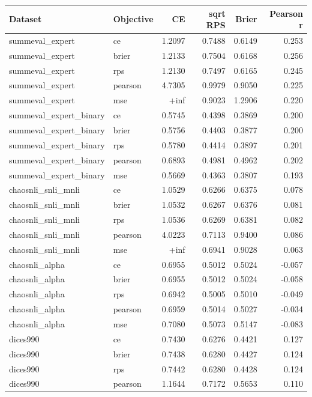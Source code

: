 \begin{tabular}{llrrrr}
\hline
Dataset & Objective & CE & sqrt RPS & Brier & Pearson r \\
\hline
summeval_expert & ce & 1.2097 & 0.7488 & 0.6149 & 0.253 \\
summeval_expert & brier & 1.2133 & 0.7504 & 0.6168 & 0.256 \\
summeval_expert & rps & 1.2130 & 0.7497 & 0.6165 & 0.245 \\
summeval_expert & pearson & 4.7305 & 0.9979 & 0.9050 & 0.225 \\
summeval_expert & mse & +inf & 0.9023 & 1.2906 & 0.220 \\
summeval_expert_binary & ce & 0.5745 & 0.4398 & 0.3869 & 0.200 \\
summeval_expert_binary & brier & 0.5756 & 0.4403 & 0.3877 & 0.200 \\
summeval_expert_binary & rps & 0.5780 & 0.4414 & 0.3897 & 0.201 \\
summeval_expert_binary & pearson & 0.6893 & 0.4981 & 0.4962 & 0.202 \\
summeval_expert_binary & mse & 0.5669 & 0.4363 & 0.3807 & 0.193 \\
chaosnli_snli_mnli & ce & 1.0529 & 0.6266 & 0.6375 & 0.078 \\
chaosnli_snli_mnli & brier & 1.0532 & 0.6267 & 0.6376 & 0.081 \\
chaosnli_snli_mnli & rps & 1.0536 & 0.6269 & 0.6381 & 0.082 \\
chaosnli_snli_mnli & pearson & 4.0223 & 0.7113 & 0.9400 & 0.086 \\
chaosnli_snli_mnli & mse & +inf & 0.6941 & 0.9028 & 0.063 \\
chaosnli_alpha & ce & 0.6955 & 0.5012 & 0.5024 & -0.057 \\
chaosnli_alpha & brier & 0.6955 & 0.5012 & 0.5024 & -0.058 \\
chaosnli_alpha & rps & 0.6942 & 0.5005 & 0.5010 & -0.049 \\
chaosnli_alpha & pearson & 0.6959 & 0.5014 & 0.5027 & -0.034 \\
chaosnli_alpha & mse & 0.7080 & 0.5073 & 0.5147 & -0.083 \\
dices990 & ce & 0.7430 & 0.6276 & 0.4421 & 0.127 \\
dices990 & brier & 0.7438 & 0.6280 & 0.4427 & 0.124 \\
dices990 & rps & 0.7442 & 0.6280 & 0.4428 & 0.124 \\
dices990 & pearson & 1.1644 & 0.7172 & 0.5653 & 0.110 \\

\end{tabular}
